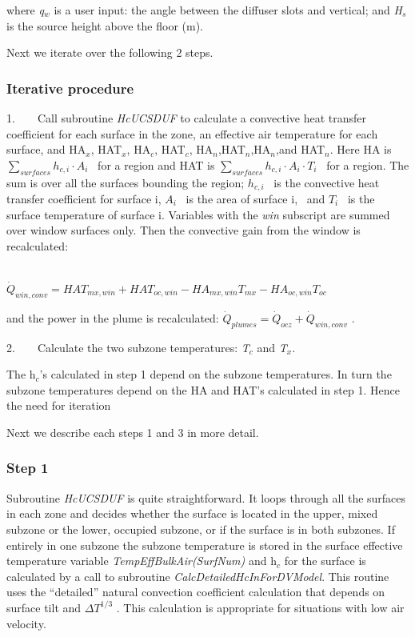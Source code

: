 where \emph{q\(_{w}\)} is a user input: the angle between the diffuser slots and vertical; and \emph{H\(_{s}\)} is the source height above the floor (m).

Next we iterate over the following 2 steps.

\subsubsection{Iterative procedure}\label{iterative-procedure-2}

1.~~~~Call subroutine \emph{HcUCSDUF} to calculate a convective heat transfer coefficient for each surface in the zone, an effective air temperature for each surface, and HA\(_{x}\), HAT\(_{x}\), HA\(_{c}\), HAT\(_{c}\), HA\(_{n}\),HAT\(_{n}\),HA\(_{n}\),and HAT\(_{n}\). Here HA is \(\sum\limits_{surfaces} {{h_{c,i}} \cdot {A_i}}\) ~for a region and HAT is \(\sum\limits_{surfaces} {{h_{c,i}} \cdot {A_i}} \cdot {T_i}\) ~for a region. The sum is over all the surfaces bounding the region; \({h_{c,i}}\) ~is the convective heat transfer coefficient for surface i, \({A_i}\) ~is the area of surface i,~ and \({T_i}\) ~is the surface temperature of surface i. Variables with the \emph{win} subscript are summed over window surfaces only. Then the convective gain from the window is recalculated:

~~~~~~~~~~~~~~~~~~~~~~~~~~~~~ \({\dot Q_{win,conv}} = HA{T_{mx,win}} + HA{T_{oc,win}} - H{A_{mx,win}}{T_{mx}} - H{A_{oc,win}}{T_{oc}}\)

and the power in the plume is recalculated: \({\dot Q_{plumes}} = {\dot Q_{ocz}} + {\dot Q_{win,conv}}\) .

2.~~~~Calculate the two subzone temperatures: \emph{T\(_{c}\)} and \emph{T\(_{x}\)}.

The h\(_{c}\)'s calculated in step 1 depend on the subzone temperatures. In turn the subzone temperatures depend on the HA and HAT's calculated in step 1. Hence the need for iteration

Next we describe each steps 1 and 3 in more detail.

\subsubsection{Step 1}\label{step-1-2}

Subroutine \emph{HcUCSDUF} is quite straightforward. It loops through all the surfaces in each zone and decides whether the surface is located in the upper, mixed subzone or the lower, occupied subzone, or if the surface is in both subzones. If entirely in one subzone the subzone temperature is stored in the surface effective temperature variable \emph{TempEffBulkAir(SurfNum)} and h\(_{c}\) for the surface is calculated by a call to subroutine \emph{CalcDetailedHcInForDVModel}. This routine uses the ``detailed'' natural convection coefficient calculation that depends on surface tilt and \(\Delta {T^{1/3}}\) . This calculation is appropriate for situations with low air velocity.

